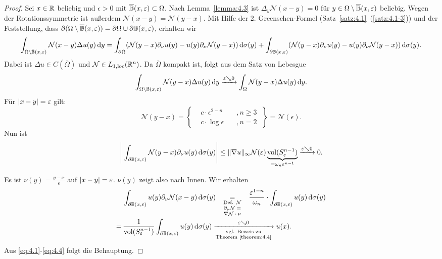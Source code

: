 \begin{proof}
  Sei $x\in\mathbb{R}$ beliebig und $\epsilon>0$ mit $\overline{\mathbb{B}}(x,\varepsilon)\subset\Omega$. Nach Lemma~\ref{lemma:4.3} ist $\Delta_y\mathcal{N}(x-y)=0$ für $y\in\Omega\setminus\overline{\mathbb{B}}(x,\varepsilon)$ beliebig. Wegen der Rotationssymmetrie ist außerdem $\mathcal{N}(x-y)=\mathcal{N}(y-x)$. Mit Hilfe der 2. Greenschen-Formel (Satz~\ref{satz:4.1}~(\ref{satz:4.1-3})) und der Feststellung, dass $\partial(\Omega\setminus\overline{\mathbb{B}}(x,\varepsilon))=\partial\Omega\cup\partial\mathbb{B}(x,\varepsilon)$, erhalten wir
    \begin{dmath*}
      \int_{\Omega\setminus\bar{\B}(x,\epsilon)}\mathcal{N}(x-y)\Delta u(y)\d y
      = \int_{\partial\Omega}(\mathcal{N}(y-x)\partial_\nu u(y)-u(y)\partial_\nu\mathcal{N}(y-x))\d\sigma(y) 
      +\int_{\partial\B(x,\epsilon)}(\mathcal{N}(y-x)\partial_\nu u(y)-u(y)\partial_\nu\mathcal{N}(y-x))\d\sigma(y).
    \end{dmath*}
    Dabei ist $\Delta u\in C(\bar\Omega)$ und $\mathcal{N}\in L_{1,\scriptsize{\textnormal{loc}}}(\mathbb{R}^n)$. Da $\bar\Omega$ kompakt ist, folgt aus dem Satz von Lebesgue
    \[
    \int_{\Omega\setminus\mathbb{B}(x,\varepsilon)}\mathcal{N}(y-x)\Delta u(y)\,\mathrm{d} y
    \xrightarrow{\varepsilon\searrow 0}
    \int_\Omega\mathcal{N}(y-x)\Delta u(y)\,\mathrm{d} y.
    \]
    Für $\lvert x-y\rvert=\varepsilon$ gilt:
    \[
    \mathcal{N}(y-x)=\left\{
      \begin{aligned}
        &c\cdot\epsilon^{2-n}\quad &,n\geq 3 \\
        &c\cdot\log\epsilon \quad&,n=2
      \end{aligned}
      \;
    \right\}
    =\mathcal{N}(\epsilon).
    \]
    Nun ist
    \[
    \left\lvert \;
      \int_{\partial\mathbb{B}(x,\varepsilon)}\mathcal{N}(y-x)\partial_\nu u(y)\,\mathrm{d}\sigma(y)
    \right\rvert\leq \lVert \nabla u\rVert_\infty\mathcal{N}(\varepsilon)
    \underbrace{\operatorname{vol}(S^{n-1}_\varepsilon)}_{=\omega_n\varepsilon^{n-1}}\xrightarrow{\varepsilon\searrow0}0.
    \]
    \addtocounter{equation}{1}
    Es ist $\nu(y)=\frac{y-x}\epsilon$ auf $\lvert x-y\rvert=\varepsilon$. $\nu(y)$ zeigt also nach Innen. Wir erhalten
    \begin{align}
     \begin{aligned}
      \label{eq:4.4}
     & \int_{\partial\B(x,\epsilon)}u(y)\partial_\nu\mathcal{N}(x-y)\d\sigma(y)
      \underset{\parbox{1.45cm}{\centering \scriptsize
          \text{Def. }$\mathcal{N}$ \\
          $\partial_\nu\mathcal{N}=\nabla\mathcal{N}\cdot\nu$
        }}=
      \frac{\epsilon^{1-n}}{\omega_n}\cdot\int_{\partial\B(x,\epsilon)}u(y)\d\sigma(y) \\
      = \, &\frac{1}{\vol(S^{n-1}_\epsilon)}\int_{\partial\B(x,\epsilon)}u(y)\d\sigma(y) 
      \xrightarrow[
      \begin{subarray}{c}
        \text{vgl. Beweis zu} \\
        \text{Theorem~\ref{theorem:4.4}}
      \end{subarray}
      ]{\epsilon\searrow0}  u(x).
      \end{aligned}
    \end{align}
    Aus \eqref{eq:4.1}-\eqref{eq:4.4} folgt die Behauptung.
\end{proof}

